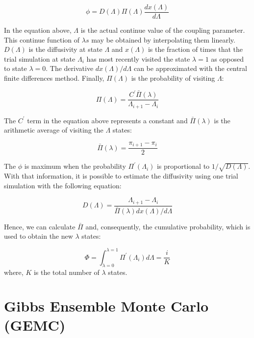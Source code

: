 \begin{equation}
\phi = D(\Lambda) \Pi (\Lambda) \dfrac{dx(\Lambda)}{d \Lambda}
\label{eqn:stream}
\end{equation}

In the equation above, $\Lambda$ is the actual continue value of the coupling parameter. This continue function of $\lambda s$ may be obtained by interpolating them linearly. $D(\Lambda)$ is the diffusivity at  state $\Lambda$ and $x(\Lambda)$ is the fraction of times that the trial simulation at state $\Lambda_{i}$ has most recently visited the state $\lambda=1$ as opposed to state $\lambda=0$. The derivative ${dx(\Lambda)}/{d \Lambda}$ can be approximated with the central finite differences method. Finally, $\Pi (\Lambda)$ is the probability of visiting $\Lambda$:

\begin{equation}
\Pi (\Lambda) = \dfrac{C^{'} \bar{\Pi} (\lambda)}{\Lambda_{i+1} - \Lambda_{i}}
\label{eqn:plambda}
\end{equation}

The $C^{'} $ term in the equation above represents a constant and $\bar{\Pi} (\lambda)$ is the arithmetic average of visiting the $\Lambda$ states:

\begin{equation}
\bar{\Pi} (\lambda) = \dfrac{\pi_{i+1} - \pi_{i}}{2}
\label{eqn:barplambda}
\end{equation}

The $\phi$ is maximum when the probability $\Pi^{'}(\Lambda_{i})$ is proportional to $1/\sqrt{D(\Lambda)}$. With that information, it is possible to estimate the diffusivity using one trial simulation with the following equation:

\begin{equation}
D(\Lambda) = \dfrac{\Lambda_{i+1} - \Lambda_{i}}{\bar{\Pi} (\lambda) {dx(\Lambda)}/{d \Lambda}}
\label{eqn:diff}
\end{equation}

Hence, we can calculate $\bar{\Pi} $ and, consequently, the cumulative probability, which is used to obtain the new $\lambda$ states:

\begin{equation}
\Phi = \int_{\lambda =0}^{\lambda =1} \Pi^{'}(\Lambda_{i}) d \Lambda = \dfrac{i}{K}
\label{eqn:cumfun}
\end{equation}
where, $K$ is the total number of $\lambda$ states.

\section{Gibbs Ensemble Monte Carlo (GEMC)}\label{gemc}

